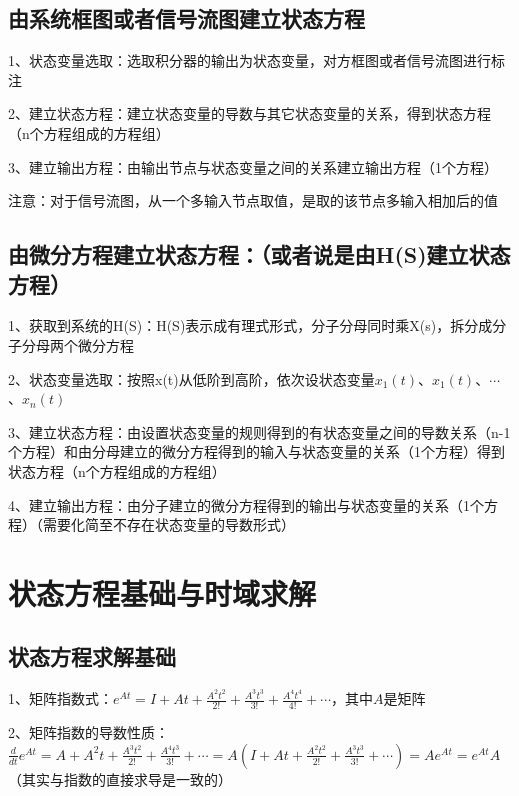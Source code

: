 \subsection{由系统框图或者信号流图建立状态方程}

1、状态变量选取：选取积分器的输出为状态变量，对方框图或者信号流图进行标注

2、建立状态方程：建立状态变量的导数与其它状态变量的关系，得到状态方程（n个方程组成的方程组）

3、建立输出方程：由输出节点与状态变量之间的关系建立输出方程（1个方程）

注意：对于信号流图，从一个多输入节点取值，是取的该节点多输入相加后的值



\subsection{由微分方程建立状态方程：（或者说是由H(S)建立状态方程）}

1、获取到系统的H(S)：H(S)表示成有理式形式，分子分母同时乘X(s)，拆分成分子分母两个微分方程

2、状态变量选取：按照x(t)从低阶到高阶，依次设状态变量$x_1(t)$、$x_1(t)$、$\cdots$、$x_n(t)$

3、建立状态方程：由设置状态变量的规则得到的有状态变量之间的导数关系（n-1个方程）和由分母建立的微分方程得到的输入与状态变量的关系（1个方程）得到状态方程（n个方程组成的方程组）

4、建立输出方程：由分子建立的微分方程得到的输出与状态变量的关系（1个方程）（需要化简至不存在状态变量的导数形式）

\section{状态方程基础与时域求解}



\subsection{状态方程求解基础}

1、矩阵指数式：$e^{A t}=I+A t+\frac{A^{2} t^{2}}{2 !}+\frac{A^{3} t^{3}}{3 !}+\frac{A^{4} t^{4}}{4 !}+\cdots$，其中$A$是矩阵

2、矩阵指数的导数性质：$\frac{d}{d t} e^{A t} =A+A^{2} t+\frac{A^{3} t^{2}}{2 !}+\frac{A^{4} t^{3}}{3 !}+\cdots=A(I+A t+\frac{A^{2} t^{2}}{2 !}+\frac{A^{3} t^{3}}{3 !}+\cdots)  = A e^{A t}=e^{A t} A$（其实与指数的直接求导是一致的）

